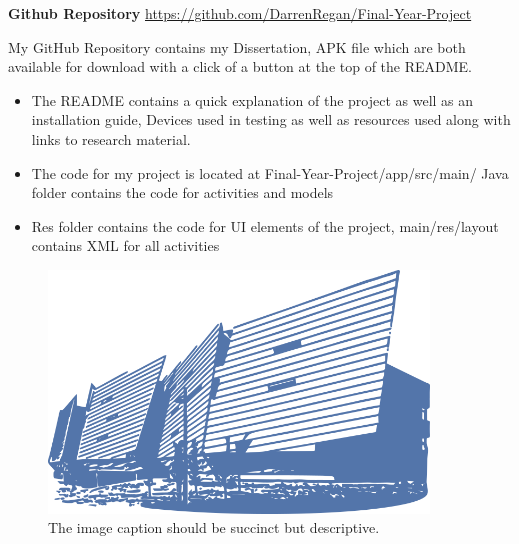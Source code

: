 \textbf {Github Repository} \url{https://github.com/DarrenRegan/Final-Year-Project}
\newline

    My GitHub Repository contains my Dissertation, APK file which are both available for download with a click of a button at the top of the README. 
\begin{itemize}
     \item The README contains a quick explanation of the project as well as an installation guide, Devices used in testing as well as resources used along with links to research material.
         
     \item The code for my project is located at Final-Year-Project/app/src/main/
     Java folder contains the code for activities and models
     
    \item Res folder contains the code for UI elements of the project, \newline              main/res/layout contains XML for all activities
\end{itemize}



\begin{figure}[h!]
	\caption{The image caption should be succinct but descriptive.}
	\label{image:myImageName}
	\centering
	\includegraphics[width=0.9\textwidth]{Images/gmit-building.png}
\end{figure}	